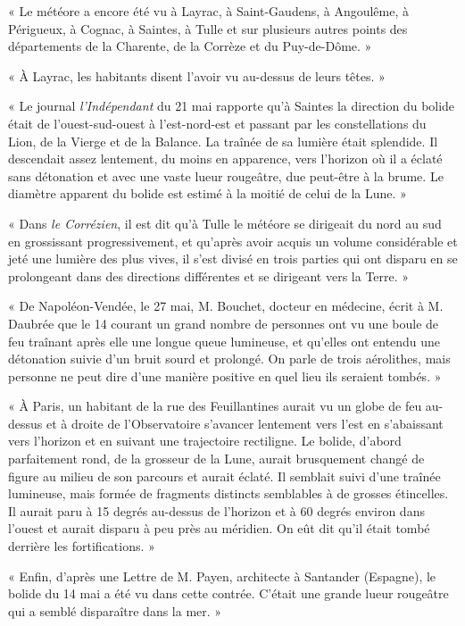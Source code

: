 \documentclass[a4paper, 11pt, oneside, polutonikogreek, french]{article}
\begin{document}
« Le météore a encore été vu à Layrac, à Saint-Gaudens, à Angoulême, à Périgueux, à Cognac, à Saintes, à Tulle et sur plusieurs autres points des départements de la Charente, de la Corrèze et du Puy-de-Dôme. »

« À Layrac, les habitants disent l'avoir vu au-dessus de leurs têtes. »

« Le journal \emph{l'Indépendant} du 21 mai rapporte qu'à Saintes la direction du bolide était de l'ouest-sud-ouest à l'est-nord-est et passant par les constellations du Lion, de la Vierge et de la Balance. La traînée de sa lumière était splendide. Il descendait assez lentement, du moins en apparence, vers l'horizon où il a éclaté sans détonation et avec une vaste lueur rougeâtre, due peut-être à la brume. Le diamètre apparent du bolide est estimé à la moitié de celui de la Lune. »

« Dans \emph{le Corrézien}, il est dit qu'à Tulle le météore se dirigeait du nord au sud en grossissant progressivement, et qu'après avoir acquis un volume considérable et jeté une lumière des plus vives, il s'est divisé en trois parties qui ont disparu en se prolongeant dans des directions différentes et se dirigeant vers la Terre. »

« De Napoléon-Vendée, le 27 mai, M. Bouchet, docteur en médecine, écrit à M. Daubrée que le 14 courant un grand nombre de personnes ont vu une boule de feu traînant après elle une longue queue lumineuse, et qu'elles ont entendu une détonation suivie d'un bruit sourd et prolongé. On parle de trois aérolithes, mais personne ne peut dire d'une manière positive en quel lieu ils seraient tombés. »

« À Paris, un habitant de la rue des Feuillantines aurait vu un globe de feu au-dessus et à droite de l'Observatoire s'avancer lentement vers l'est en s'abaissant vers l'horizon et en suivant une trajectoire rectiligne. Le bolide, d'abord parfaitement rond, de la grosseur de la Lune, aurait brusquement changé de figure au milieu de son parcours et aurait éclaté. Il semblait suivi d'une traînée lumineuse, mais formée de fragments distincts semblables à de grosses étincelles. Il aurait paru à 15 degrés au-dessus de l'horizon et à 60 degrés environ dans l'ouest et aurait disparu à peu près au méridien. On eût dit qu'il était tombé derrière les fortifications. »

« Enfin, d'après une Lettre de M. Payen, architecte à Santander (Espagne), le bolide du 14 mai a été vu dans cette contrée. C'était une grande lueur rougeâtre qui a semblé disparaître dans la mer. »
\end{document}
